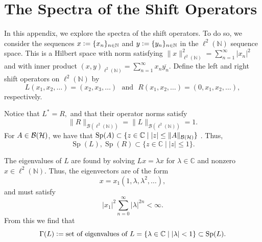 \chapter{The Spectra of the Shift Operators} \label{Shift Appendix}


In this appendix, we explore the spectra of the shift operators. To do so, we consider the sequences $x \vcentcolon= \{x_n\}_{n \in \mathbb{N}}$ and $y \vcentcolon= \{y_n\}_{n \in \mathbb{N}}$ in the $\ell^2(\mathbb{N})$ sequence space. This is a Hilbert space with norm satisfying $\| x \|_{\ell^2(\mathbb{N})}^2 = \sum_{n=1}^{\infty} |x_n|^2$ and with inner product $( x, y )_{\ell^2(\mathbb{N})} = \sum_{n=1}^{\infty} x_n \overline{y_n}.$
Define the left and right shift operators on $\ell^2(\mathbb{N})$ by
\begin{equation}
    L(x_1, x_2, \dots) = (x_2, x_3, \dots) \,\, \text{ and } \,\, R(x_1, x_2, \dots) = (0, x_1, x_2, \dots),
\end{equation}
respectively. 

Notice that $L^* = R,$ and that their operator norms satisfy 
\begin{equation*}
    \| R \|_{\mathcal{B}(\ell^2(\mathbb{N}))} = \|L\|_{\mathcal{B}(\ell^2(\mathbb{N}))} = 1.
\end{equation*}
For $A \in \mathcal{B}(\mathcal{H})$, we have that
 $\operatorname{Sp}(A) \subset \{ z \in \mathbb{C} \mid |z| \le \|A\|_{\mathcal{B}(\mathcal{H})} \}$ \cite[Theorem~7.3-4]{krey}.
Thus,
\begin{equation}
    \operatorname{Sp}(L),  \operatorname{Sp}(R) \subset \{ z \in \mathbb{C} \mid |z| \le 1 \}.
\end{equation}


 The eigenvalues of $L$ are found by solving $Lx = \lambda x$ for $\lambda \in \mathbb{C}$ and nonzero $x \in \ell^2(\mathbb{N}).$
    Thus, the eigenvectors are of the form
    \begin{equation}
        x = x_1 (1, \lambda, \lambda^2, \dots),
    \end{equation}
    and must satisfy
    \begin{equation}
        |x_1|^2 \sum_{n=0}^{\infty} |\lambda|^{2n} < \infty.
    \end{equation}
 From this we find that
 \begin{equation}
     \Gamma(L) \vcentcolon= \text{set of eigenvalues of } L = \{ \lambda \in \mathbb{C} \mid |\lambda| < 1 \} \subset \operatorname{Sp}(L).
 \end{equation}


